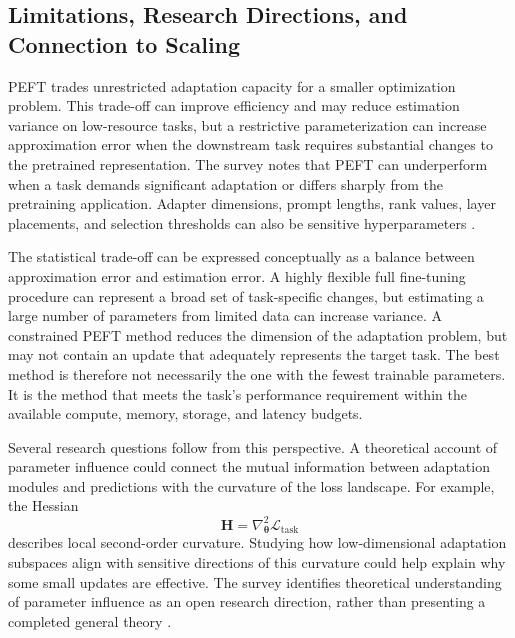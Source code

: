 \subsection{Limitations, Research Directions, and Connection to Scaling}
\label{subsec:peft-limitations-outlook}

PEFT trades unrestricted adaptation capacity for a smaller optimization
problem. This trade-off can improve efficiency and may reduce estimation
variance on low-resource tasks, but a restrictive parameterization can
increase approximation error when the downstream task requires substantial
changes to the pretrained representation. The survey notes that PEFT can
underperform when a task demands significant adaptation or differs sharply
from the pretraining application. Adapter dimensions, prompt lengths, rank
values, layer placements, and selection thresholds can also be sensitive
hyperparameters \parencite{prottasha2025peft}.

The statistical trade-off can be expressed conceptually as a balance between
approximation error and estimation error. A highly flexible full fine-tuning
procedure can represent a broad set of task-specific changes, but estimating
a large number of parameters from limited data can increase variance. A
constrained PEFT method reduces the dimension of the adaptation problem, but
may not contain an update that adequately represents the target task. The
best method is therefore not necessarily the one with the fewest trainable
parameters. It is the method that meets the task's performance requirement
within the available compute, memory, storage, and latency budgets.

Several research questions follow from this perspective. A theoretical
account of parameter influence could connect the mutual information between
adaptation modules and predictions with the curvature of the loss landscape.
For example, the Hessian
\begin{equation}
    \mathbf{H}
    =
    \nabla_{\boldsymbol{\theta}}^2
    \mathcal{L}_{\mathrm{task}}
    \label{eq:peft-hessian}
\end{equation}
describes local second-order curvature. Studying how low-dimensional
adaptation subspaces align with sensitive directions of this curvature could
help explain why some small updates are effective. The survey identifies
theoretical understanding of parameter influence as an open research
direction, rather than presenting a completed general theory
\parencite{prottasha2025peft}.

